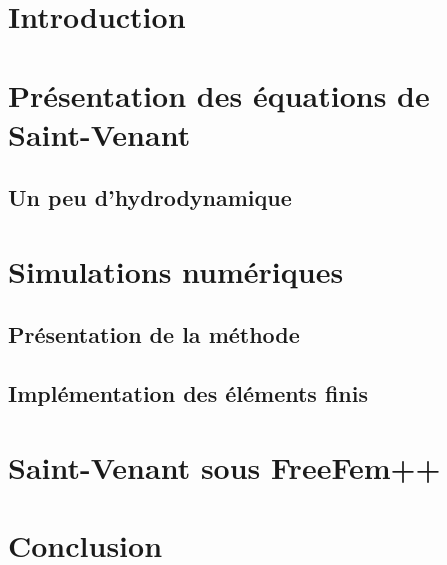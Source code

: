 \documentclass{report}
\begin{document}


\chapter{Introduction}
\paragraph{}

\chapter{Présentation des équations de Saint-Venant}
\section{Un peu d'hydrodynamique}



\chapter{Simulations numériques}
\section{Présentation de la méthode}

\section{Implémentation des éléments finis}

\chapter{Saint-Venant sous FreeFem++}


\chapter{Conclusion}
\end{document}
